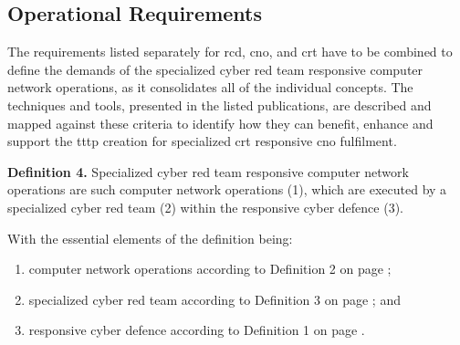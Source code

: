 \subsection{Operational Requirements}
\label{sec:scrtop}
\glsresetall
The requirements listed separately for \gls{rcd}, \gls{cno}, and \gls{crt} have to be combined to define the demands of the specialized cyber red team responsive computer network operations, as it consolidates all of the individual concepts. The techniques and tools, presented in the listed publications, are described and mapped against these criteria to identify how they can benefit, enhance and support the \gls{tttp} creation for specialized \gls{crt} responsive \gls{cno} fulfilment.

\begin{description}
    \label{def:scrtop}
    \item \textbf{Definition 4.} Specialized cyber red team responsive computer network operations are such computer network operations (1), which are executed by a specialized cyber red team (2) within the responsive cyber defence (3).

    With the essential elements of the definition being:
    \begin{enumerate}
        \item computer network operations according to Definition 2 on page \pageref{def:cno};
        \item specialized cyber red team according to Definition 3 on page \pageref{def:crt}; and
        \item responsive cyber defence according to Definition 1 on page \pageref{def:rcd}.
    \end{enumerate}
\end{description}


